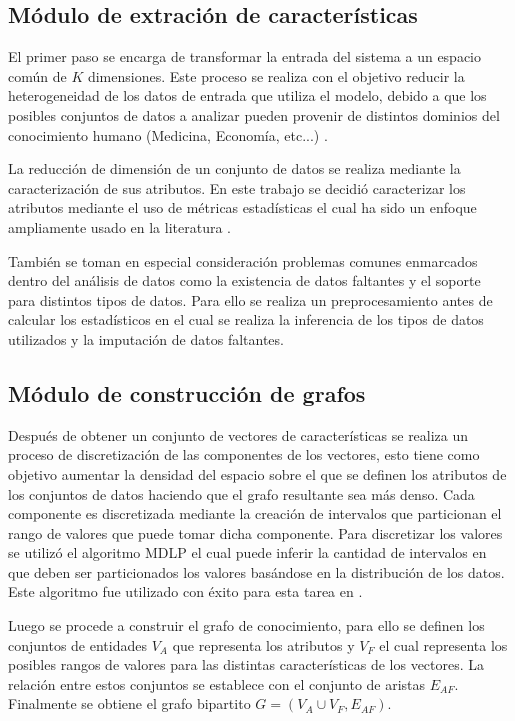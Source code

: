 \subsection{M\'odulo de extraci\'on de caracter\'isticas}

El primer paso se encarga de transformar la entrada del sistema a un
espacio com\'un de $K$ dimensiones. Este proceso se realiza con el
objetivo reducir la heterogeneidad de los datos de entrada que utiliza
el modelo, debido a que los posibles conjuntos de datos a analizar
pueden provenir de distintos dominios del conocimiento humano (Medicina, Econom\'ia, etc...) \cite{vartak2017towards}.

La reducci\'on de dimensi\'on de un conjunto de datos se realiza mediante
la caracterizaci\'on de sus atributos. En este trabajo se decidi\'o caracterizar
los atributos mediante el uso de m\'etricas estad\'isticas el cual ha sido
un enfoque ampliamente usado en la literatura \cite{key2012vizdeck} \cite{vartak2014seedb} \cite{demiralp2017foresight} \cite{qian2020ml}.

Tambi\'en se toman en especial consideraci\'on problemas comunes
enmarcados dentro del an\'alisis de datos como la existencia de datos faltantes \cite{schafer2002missing}
y el soporte para distintos tipos de datos. Para ello se realiza un preprocesamiento
antes de calcular los estad\'isticos en el cual se realiza la inferencia de los tipos de datos utilizados
y la imputaci\'on de datos faltantes.

\subsection{M\'odulo de construcci\'on de grafos}

Despu\'es de obtener un conjunto de vectores de caracter\'isticas se realiza un proceso
de discretizaci\'on de las componentes de los vectores, esto tiene como objetivo aumentar
la densidad del espacio sobre el que se definen los atributos de los conjuntos de datos haciendo que 
el grafo resultante sea m\'as denso.
Cada componente es discretizada mediante la creaci\'on de intervalos que particionan el
rango de valores que puede tomar dicha componente. Para discretizar los
valores se utiliz\'o el algoritmo MDLP \cite{fayyad1993multi} el cual puede
inferir la cantidad de intervalos en que deben ser particionados los valores
bas\'andose en la distribuci\'on de los datos. Este algoritmo fue utilizado con
\'exito para esta tarea en \cite{li2021kg4vis}.

Luego se procede a construir el grafo de conocimiento, para ello se definen los conjuntos
de entidades $V_A$ que representa los atributos y $V_F$ el cual representa los posibles
rangos de valores para las distintas caracter\'isticas de los vectores. La relaci\'on entre
estos conjuntos se establece con el conjunto de aristas $E_{AF}$. Finalmente se
obtiene el grafo bipartito $G = (V_A \cup V_F, E_{AF})$.

